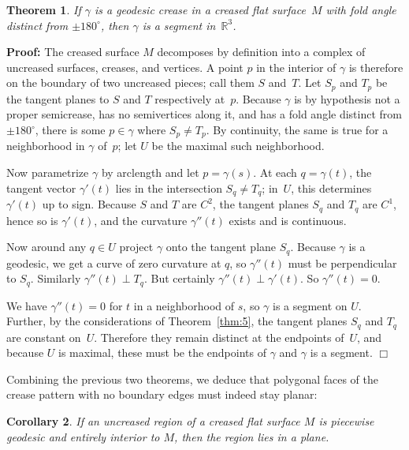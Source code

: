 \documentclass[11pt,letterpaper]{article}
\newtheorem{theorem}{Theorem}
\newtheorem{corollary}[theorem]{Corollary}
\newenvironment{proof}{\noindent\textbf{Proof: }\ignorespaces}
  {\hspace*{\fill}$\Box$\medskip}
\newcommand\R{\mathbb R}
\begin{document}
\begin{theorem} \label{straight creases stay straight}
  If $\gamma$ is a geodesic crease in a creased flat surface~$M$
  with fold angle distinct from $\pm 180^\circ$,
  then $\gamma$ is a segment in~$\R^3$.
\end{theorem}
\begin{proof}
  The creased surface $M$ decomposes by definition into a complex of
  uncreased surfaces, creases, and vertices.
  A point $p$ in the interior of $\gamma$ is therefore on the boundary of two
  uncreased pieces; call them $S$ and~$T$.  Let $S_p$ and $T_p$ be the tangent
  planes to $S$ and $T$ respectively at~$p$.
  Because $\gamma$ is by hypothesis not a proper semicrease,
  has no semivertices along it,
  and has a fold angle distinct from $\pm 180^\circ$,
  there is some $p \in \gamma$ where $S_p \neq T_p$.
  By continuity, the same is true for a neighborhood in $\gamma$ of~$p$;
  let $U$ be the maximal such neighborhood.

  Now parametrize $\gamma$ by arclength and let $p = \gamma(s)$.  At
  each $q = \gamma(t)$, the tangent vector $\gamma'(t)$ lies in the
  intersection $S_q \neq T_q$; in~$U$, this determines $\gamma'(t)$ up
  to sign.  Because $S$ and $T$ are $C^2$, the tangent planes $S_q$ and $T_q$
  are $C^1$, hence so is $\gamma'(t)$, and the curvature $\gamma''(t)$
  exists and is continuous.

  Now around any $q \in U$ project $\gamma$ onto the tangent plane
  $S_q$.  Because $\gamma$ is a geodesic, we get a curve of zero
  curvature at $q$, so $\gamma''(t)$ must be perpendicular to $S_q$.
  Similarly $\gamma''(t) \perp T_q$.  But certainly $\gamma''(t) \perp
  \gamma'(t)$.  So $\gamma''(t) = 0$.

  We have $\gamma''(t) = 0$ for $t$ in a neighborhood of $s$, so
  $\gamma$ is a segment on $U$.  Further, by the considerations of
  Theorem~\ref{thm:5}, the tangent planes $S_q$ and $T_q$ are constant
  on~$U$.  Therefore they remain distinct at the endpoints of~$U$, and
  because $U$ is maximal, these must be the endpoints of $\gamma$ and
  $\gamma$ is a segment.
\end{proof}

Combining the previous two theorems, we deduce that
polygonal faces of the crease pattern with no boundary edges
must indeed stay planar:

\begin{corollary}\label{planar dammit}
  If an uncreased region of a creased flat surface $M$ is piecewise
  geodesic and entirely interior to $M$, then the region lies in a plane.
\end{corollary}
\end{document}
